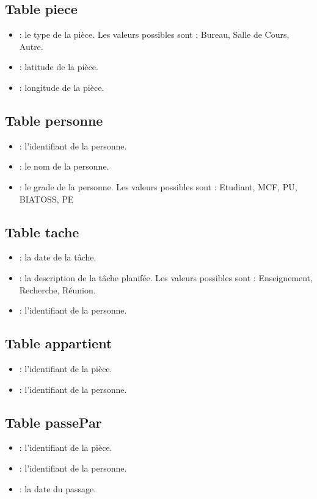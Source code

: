 \subsection{Table piece}
\begin{itemize}
	\item {} : le type de la pièce. Les valeurs possibles sont : Bureau, Salle de Cours, Autre.
	\item {} : latitude de la pièce.
	\item {} : longitude de la pièce.
\end{itemize}

\subsection{Table personne}
\begin{itemize}
	\item {} : l'identifiant de la personne.
	\item {} : le nom de la personne.
	\item {} : le grade de la personne. Les valeurs possibles sont : Etudiant, MCF, PU, BIATOSS, PE
\end{itemize}

\subsection{Table tache}
\begin{itemize}
	\item {} : la date de la tâche.
	\item {} : la description de la tâche planifée. Les valeurs possibles sont : Enseignement, Recherche, Réunion.
	\item {} : l'identifiant de la personne.
\end{itemize}

\subsection{Table appartient}
\begin{itemize}
	\item {} : l'identifiant de la pièce.
	\item {} : l'identifiant de la personne.
\end{itemize}

\subsection{Table passePar}
\begin{itemize}
	\item {} : l'identifiant de la pièce.
	\item {} : l'identifiant de la personne.
	\item {} : la date du passage.
\end{itemize}

